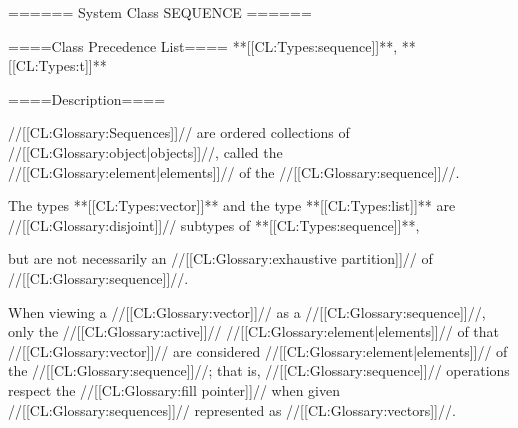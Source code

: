 ====== System Class SEQUENCE ======

====Class Precedence List==== **[[CL:Types:sequence]]**, **[[CL:Types:t]]**

====Description====

//[[CL:Glossary:Sequences]]// are ordered collections of //[[CL:Glossary:object|objects]]//, called the //[[CL:Glossary:element|elements]]// of the //[[CL:Glossary:sequence]]//.

The types **[[CL:Types:vector]]** and the type **[[CL:Types:list]]** are //[[CL:Glossary:disjoint]]// subtypes of **[[CL:Types:sequence]]**,

but are not necessarily an //[[CL:Glossary:exhaustive partition]]// of //[[CL:Glossary:sequence]]//.

When viewing a //[[CL:Glossary:vector]]// as a //[[CL:Glossary:sequence]]//, only the //[[CL:Glossary:active]]// //[[CL:Glossary:element|elements]]// of that //[[CL:Glossary:vector]]// are considered //[[CL:Glossary:element|elements]]// of the //[[CL:Glossary:sequence]]//; that is, //[[CL:Glossary:sequence]]// operations respect the //[[CL:Glossary:fill pointer]]// when given //[[CL:Glossary:sequences]]// represented as //[[CL:Glossary:vectors]]//.

